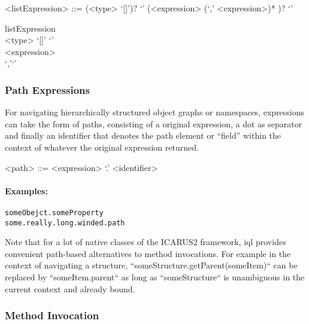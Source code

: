 \documentclass[11pt,a4paper]{article}
\begin{document}
\begin{gram}
	\label{gram:list-expression}
	\begin{grammar}	
		<listExpression> ::= (<type> `[]')? `{' (<expression> (`,' <expression>)* )? `}'	
	\end{grammar}
	\diagsep
	\begin{rrdiag*}{listExpression}
		\sst \\ <type> `[]' \est `{' \sst \\ \srp <expression> \\ `,'\erp  \est `}' \\	
	\end{rrdiag*}
\end{gram}

\subsubsection{Path Expressions}
\label{sec:path-expressions}

For navigating hierarchically structured object graphs or namespaces, expressions can take the form of paths, consisting of a original expression, a dot as separator and finally an identifier that denotes the path element or ``field'' within the context of whatever the original expression returned.

\begin{gram}
	\label{gram:path-expression}
	\begin{grammar}	
		<path> ::= <expression> `.' <identifier> 	
	\end{grammar}
\end{gram}

\paragraph{Examples:}

\begin{Verbatim}[samepage=true]
someObejct.someProperty
some.really.long.winded.path
\end{Verbatim}

\noindent Note that for a lot of native classes of the ICARUS2 framework, \ac{iql} provides convenient path-based alternatives to method invocations. For example in  the context of navigating a structure, ``someStructure.getParent(someItem)`` can be replaced by ``someItem.parent`` as long as ``someStructure`` is unambiguous in the current context and already bound.

\subsubsection{Method Invocation}
\label{sec:method-invocations}
\end{document}
